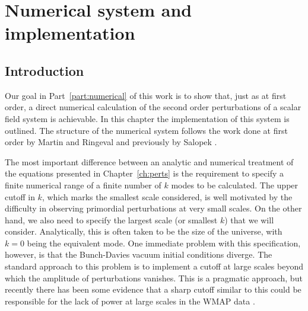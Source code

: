 \renewcommand{\CVSrevision}{\version$Id: numerical.tex,v 1.40 2009/11/05 19:16:00 ith Exp $}
% 

\chapter{Numerical system and implementation}
\label{ch:numericalsystem}
% 
% 
\section{Introduction}
\label{sec:intro-num}

Our goal in Part~\ref{part:numerical} of this work is to show that, just as at first
order, a direct numerical calculation of the second order perturbations of a
scalar field system is achievable. 
In this chapter the implementation of this system is outlined.
The structure of the numerical
system follows the work done at first order by Martin
and Ringeval \cite{Martin:2006rs, Ringeval:2007am} and previously by
Salopek \etal \cite{Salopek:1988qh}.


The most important difference between an analytic and numerical treatment of the
equations presented in Chapter~\ref{ch:perts} is the requirement to specify a finite
numerical range of a finite number of $k$ modes to be calculated.
The upper cutoff in $k$, which marks the smallest scale considered, is well
motivated by the difficulty in observing primordial perturbations at very small
scales. 
On the other hand, we also need to specify the largest scale (or smallest $k$) that
we
will consider. Analytically, this is often taken to be the size of the universe,
with $k=0$ being the equivalent mode. One immediate problem with this
specification, however, is that
the Bunch-Davies vacuum initial conditions diverge. The standard approach to this
problem is to implement a cutoff
at large scales beyond which the amplitude of perturbations vanishes. This is a
pragmatic approach, but recently there has been some evidence that a sharp
cutoff similar to this could be responsible for the lack of power at large
scales in the WMAP data \cite{Lyth:2007jh, spergel, Sinha:2005mn,Kim:2009pf}.
 
